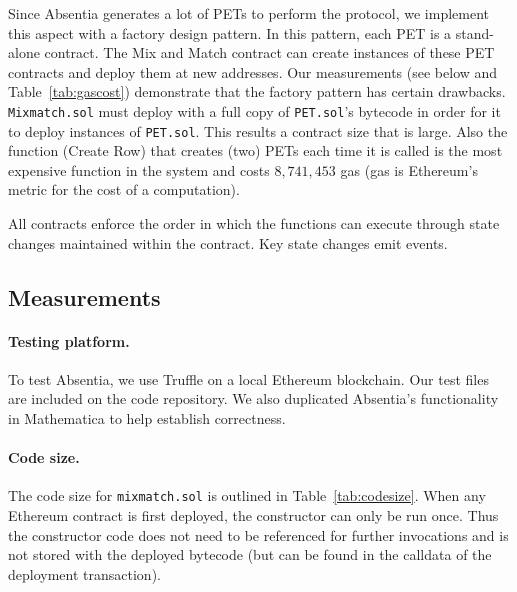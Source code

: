 Since Absentia generates a lot of PETs to perform the protocol, we implement this aspect with a factory design pattern. In this pattern, each PET is a stand-alone contract. The Mix and Match contract can create instances of these PET contracts and deploy them at new addresses. Our measurements (see below and Table~\ref{tab:gascost}) demonstrate that the factory pattern has certain drawbacks. \texttt{Mixmatch.sol} must deploy with a full copy of \texttt{PET.sol}'s bytecode in order for it to deploy instances of \texttt{PET.sol}. This results a contract size that is large. Also the function (Create Row) that creates (two) PETs each time it is called is the most expensive function in the system and costs $8,741,453$ gas (gas is Ethereum's metric for the cost of a computation). 

All contracts enforce the order in which the functions can execute through state changes maintained within the contract. Key state changes emit events. 


\subsection{Measurements}


\paragraph{Testing platform.}  To test Absentia, we use Truffle on a local Ethereum blockchain. Our test files are included on the code repository. We also duplicated Absentia's functionality in Mathematica to help establish correctness.




\paragraph{Code size.} 

The code size for \texttt{mixmatch.sol} is outlined in Table~\ref{tab:codesize}. When any Ethereum contract is first deployed, the constructor can only be run once. Thus the constructor code does not need to be referenced for further invocations and is not stored with the deployed bytecode (but can be found in the calldata of the deployment transaction). 

